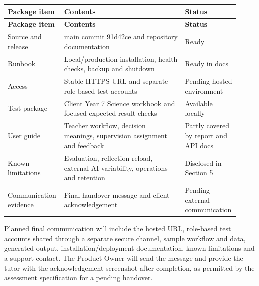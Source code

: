 \documentclass[11pt,a4paper]{article}
\begin{document}
\begin{small}

\setlength{\tabcolsep}{3pt}

\begin{longtable}{>{\raggedright\arraybackslash}p{0.187\linewidth}>{\raggedright\arraybackslash}p{0.511\linewidth}>{\raggedright\arraybackslash}p{0.222\linewidth}}

\hline

\textbf{Package item} & \textbf{Contents} & \textbf{Status} \\ \hline

\endfirsthead

\hline

\textbf{Package item} & \textbf{Contents} & \textbf{Status} \\ \hline

\endhead

Source and release & main commit 91d42ce and repository documentation & Ready \\ \hline

Runbook & Local/\allowbreak{}production installation, health checks, backup and shutdown & Ready in docs \\ \hline

Access & Stable HTTPS URL and separate role-based test accounts & Pending hosted environment \\ \hline

Test package & Client Year 7 Science workbook and focused expected-result checks & Available locally \\ \hline

User guide & Teacher workflow, decision meanings, supervision assignment and feedback & Partly covered by report and API docs \\ \hline

Known limitations & Evaluation, reflection reload, external-AI variability, operations and retention & Disclosed in Section 5 \\ \hline

Communication evidence & Final handover message and client acknowledgement & Pending external communication \\ \hline

\end{longtable}

\end{small}

Planned final communication will include the hosted URL, role-based test accounts shared through a separate secure channel, sample workflow and data, generated output, installation/deployment documentation, known limitations and a support contact. The Product Owner will send the message and provide the tutor with the acknowledgement screenshot after completion, as permitted by the assessment specification for a pending handover.\par
\end{document}

